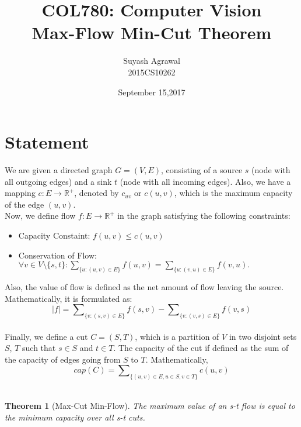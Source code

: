 \documentclass[11pt,a4paper]{article}
\title{COL780: Computer Vision\\Max-Flow Min-Cut Theorem}
\author{Suyash Agrawal\\2015CS10262}
\date{September 15,2017}
\begin{document}
\newtheorem*{thm}{Theorem}
\newtheorem{lm}{Lemma}
\newtheorem{cor}{Corollary}[lm]
\maketitle
\section{Statement}
    We are given a directed graph $G = (V,E)$, consisting of a source $s$ (node with all
    outgoing edges) and a sink $t$ (node with all incoming edges). Also, we have a mapping
    $c: E \rightarrow \mathbb{R}^{+}$, denoted by $c_{uv}$ or $c(u,v)$, which is the maximum capacity
    of the edge $(u,v)$.\\
    Now, we define flow $f: E \rightarrow \mathbb{R}^+$ in the graph satisfying the following constraints:
    \begin{itemize}
        \item Capacity Constaint: $f(u,v) \leq c(u,v)$
        \item Conservation of Flow: $\forall v\in V\setminus \{s,t\}: \sum \nolimits_{\{u:(u,v)\in E\}}f(u,v)
            =\sum \nolimits_{\{u:(v,u)\in E\}}f(v,u).$
    \end{itemize} 
    Also, the value of flow is defined as the net amount of flow leaving the source. Mathematically, it is formulated as:
    $$|f| = \sum \nolimits_{\{v:(s,v)\in E\}}f(s,v) - \sum \nolimits_{\{v:(v,s)\in E\}}f(v,s)$$
    \\
    Finally, we define a cut $C=(S,T)$, which is a partition of $V$ in two disjoint sets $S$, $T$ such that $s \in S$ and
    $t \in T$. The capacity of the cut if defined as the sum of the capacity of edges going from $S$ to $T$. Mathematically,
    $$cap(C) = \sum \nolimits_{\{(u,v)\in E, u \in S, v \in T\}}c(u,v)$$
    \\
        \begin{thm}[Max-Cut Min-Flow] The maximum value of an s-t flow is equal to the minimum capacity over all s-t cuts.\end{thm}
\end{document}
